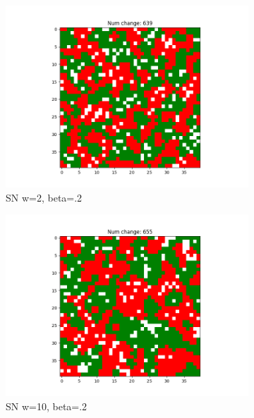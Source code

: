 \documentclass[11pt]{article}
\begin{document}
\begin{figure}[h]
\begin{subfigure}{0.14\textwidth}
			\includegraphics[width=\linewidth]{final_rachael_w2b20.png}
			\caption{\centering SN w=2, beta=.2}
			\label{sn_finalw5b20}
		\end{subfigure}\hfill
		\begin{subfigure}{0.14\textwidth}
			\includegraphics[width=\linewidth]{final_rachael_w10b20.png}
			\caption{\centering SN w=10, beta=.2}
			\label{sn_finalw10b20}
		\end{subfigure}\hfill
		\begin{subfigure}{0.14\textwidth}

\end{subfigure}
\end{figure}
\end{document}
